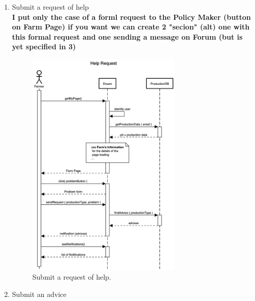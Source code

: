 \begin{enumerate}
    \item Submit a request of help\\
    \textbf{I put only the case of a forml request to the Policy Maker (button on Farm Page) if you want we can create 2 "secion" (alt) one with this formal request and one sending a message on Forum (but is yet specified in 3)}
    \begin{figure}[H]
        \begin{center}
        \includegraphics[width=0.7\textwidth]{sequence/HelpRequest.png}
        \caption{Submit a request of help.}
        \label{fig:state6}
        \end{center}
    \end{figure}
    \item Submit an advice
    \begin{figure}[H]
        \begin{center}

\end{center}
\end{figure}
\end{enumerate}
